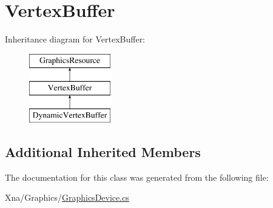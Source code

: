 \hypertarget{classMicrosoft_1_1Xna_1_1Framework_1_1Graphics_1_1VertexBuffer}{}\section{Vertex\+Buffer}
\label{classMicrosoft_1_1Xna_1_1Framework_1_1Graphics_1_1VertexBuffer}
Inheritance diagram for Vertex\+Buffer\+:\begin{figure}[H]
\begin{center}
\leavevmode
\includegraphics[height=3.000000cm]{classMicrosoft_1_1Xna_1_1Framework_1_1Graphics_1_1VertexBuffer}
\end{center}
\end{figure}
\subsection*{Additional Inherited Members}


The documentation for this class was generated from the following file\+:\begin{DoxyCompactItemize}
\item 
Xna/\+Graphics/\hyperlink{GraphicsDevice_8cs}{Graphics\+Device.\+cs}\end{DoxyCompactItemize}
